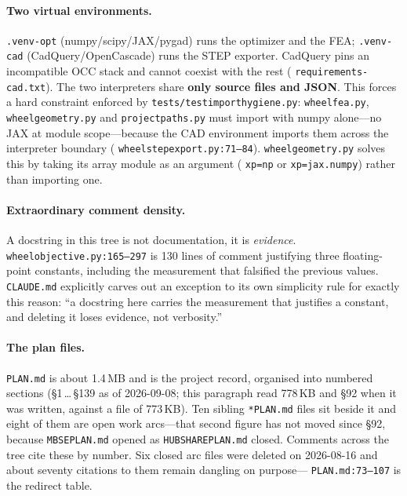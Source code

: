 \documentclass[11pt,a4paper]{article}
\DeclareRobustCommand{\code}[1]{%
  \texttt{\small\def\_{\textunderscore\discretionary{}{}{}}#1}}
\newcommand{\at}[2]{\code{#1:#2}}
\begin{document}
\paragraph{Two virtual environments.}
\code{.venv-opt} (numpy/scipy/JAX/pygad) runs the optimizer and the FEA;
\code{.venv-cad} (CadQuery/OpenCascade) runs the STEP exporter. CadQuery pins an
incompatible OCC stack and cannot coexist with the rest (\code{requirements-cad.txt}).
The two interpreters share \textbf{only source files and JSON}. This forces a hard
constraint enforced by \code{tests/test\_import\_hygiene.py}: \code{wheel\_fea.py},
\code{wheel\_geometry.py} and \code{project\_paths.py} must import with numpy
alone---no JAX at module scope---because the CAD environment imports them across the
interpreter boundary (\at{wheel\_step\_export.py}{71--84}). \code{wheel\_geometry.py}
solves this by taking its array module as an argument (\code{xp=np} or
\code{xp=jax.numpy}) rather than importing one.

\paragraph{Extraordinary comment density.}
A docstring in this tree is not documentation, it is \emph{evidence}.
\at{wheel\_objective.py}{165--297} is 130 lines of comment justifying three
floating-point constants, including the measurement that falsified the previous values.
\code{CLAUDE.md} explicitly carves out an exception to its own simplicity rule for
exactly this reason: ``a docstring here carries the measurement that justifies a
constant, and deleting it loses evidence, not verbosity.''

\paragraph{The plan files.}
\code{PLAN.md} is about 1.4\,MB and is the project record, organised into numbered
sections (\S1\,\ldots\,\S139 as of 2026-09-08; this paragraph read 778\,KB and \S92 when
it was written, against a file of 773\,KB). Ten sibling \code{*\_PLAN.md} files sit
beside it and eight of them are open work arcs---that second figure has not moved since
\S92, because \code{MBSE\_PLAN.md}
opened as \code{HUBSHARE\_PLAN.md} closed. Comments across the tree cite these by
number. Six closed arc files were deleted on 2026-08-16 and about seventy citations to
them remain dangling on purpose---\at{PLAN.md}{73--107} is the redirect table.

\end{document}
